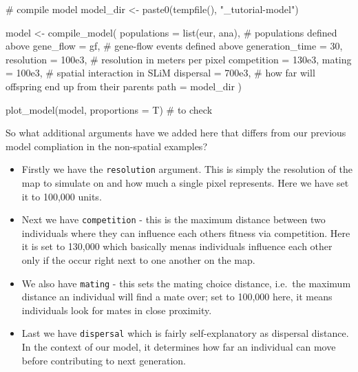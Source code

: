 \documentclass[
  letterpaper,
  DIV=11,
  numbers=noendperiod]{scrartcl}
\newenvironment{Shaded}{\begin{snugshade}}{\end{snugshade}}
\newcommand{\AttributeTok}[1]{\textcolor[rgb]{0.40,0.45,0.13}{#1}}
\newcommand{\CommentTok}[1]{\textcolor[rgb]{0.37,0.37,0.37}{#1}}
\newcommand{\DecValTok}[1]{\textcolor[rgb]{0.68,0.00,0.00}{#1}}
\newcommand{\FloatTok}[1]{\textcolor[rgb]{0.68,0.00,0.00}{#1}}
\newcommand{\FunctionTok}[1]{\textcolor[rgb]{0.28,0.35,0.67}{#1}}
\newcommand{\NormalTok}[1]{\textcolor[rgb]{0.00,0.23,0.31}{#1}}
\newcommand{\OtherTok}[1]{\textcolor[rgb]{0.00,0.23,0.31}{#1}}
\newcommand{\StringTok}[1]{\textcolor[rgb]{0.13,0.47,0.30}{#1}}
\providecommand{\tightlist}{%
  \setlength{\itemsep}{0pt}\setlength{\parskip}{0pt}}\usepackage{longtable,booktabs,array}
\begin{document}
\begin{Shaded}
\begin{Highlighting}[]
\CommentTok{\# compile model}
\NormalTok{model\_dir }\OtherTok{\textless{}{-}} \FunctionTok{paste0}\NormalTok{(}\FunctionTok{tempfile}\NormalTok{(), }\StringTok{"\_tutorial{-}model"}\NormalTok{)}


\NormalTok{model }\OtherTok{\textless{}{-}} \FunctionTok{compile\_model}\NormalTok{(}
  \AttributeTok{populations =} \FunctionTok{list}\NormalTok{(eur, ana), }\CommentTok{\# populations defined above}
  \AttributeTok{gene\_flow =}\NormalTok{ gf, }\CommentTok{\# gene{-}flow events defined above}
  \AttributeTok{generation\_time =} \DecValTok{30}\NormalTok{,}
  \AttributeTok{resolution =} \FloatTok{100e3}\NormalTok{, }\CommentTok{\# resolution in meters per pixel}
  \AttributeTok{competition =} \FloatTok{130e3}\NormalTok{, }\AttributeTok{mating =} \FloatTok{100e3}\NormalTok{, }\CommentTok{\# spatial interaction in SLiM}
  \AttributeTok{dispersal =} \FloatTok{700e3}\NormalTok{, }\CommentTok{\# how far will offspring end up from their parents}
  \AttributeTok{path =}\NormalTok{ model\_dir}
\NormalTok{)}

\FunctionTok{plot\_model}\NormalTok{(model, }\AttributeTok{proportions =}\NormalTok{ T) }\CommentTok{\# to check}
\end{Highlighting}
\end{Shaded}

So what additional arguments have we added here that differs from our
previous model compliation in the non-spatial examples?

\begin{itemize}
\tightlist
\item
  Firstly we have the \texttt{resolution} argument. This is simply the
  resolution of the map to simulate on and how much a single pixel
  represents. Here we have set it to 100,000 units.
\item
  Next we have \texttt{competition} - this is the maximum distance
  between two individuals where they can influence each others fitness
  via competition. Here it is set to 130,000 which basically menas
  individuals influence each other only if the occur right next to one
  another on the map.
\item
  We also have \texttt{mating} - this sets the mating choice distance,
  i.e.~the maximum distance an individual will find a mate over; set to
  100,000 here, it means individuals look for mates in close proximity.
\item
  Last we have \texttt{dispersal} which is fairly self-explanatory as
  dispersal distance. In the context of our model, it determines how far
  an individual can move before contributing to next generation.
\end{itemize}
\end{document}
